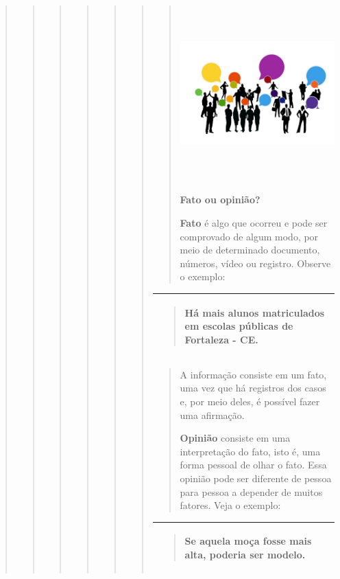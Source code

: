 \begin{quote}
\begin{quote}
\begin{quote}
\begin{quote}
\begin{quote}
\begin{quote}
\begin{quote}
\includegraphics[width=3.98294in,height=2.65514in]{media/image24.jpeg}

\textbf{Fato ou opinião?}

\textbf{Fato} é algo que ocorreu e pode ser comprovado de algum modo,
por meio de determinado documento, números, vídeo ou registro. Observe o
exemplo:
\end{quote}

\begin{longtable}[]{@{}l@{}}
\toprule
\begin{minipage}[t]{0.97\columnwidth}\raggedright\strut
\begin{quote}
Há mais alunos matriculados em escolas públicas de Fortaleza - CE.
\end{quote}\strut
\end{minipage}\tabularnewline
\bottomrule
\end{longtable}

\begin{quote}
A informação consiste em um fato, uma vez que há registros dos casos e,
por meio deles, é possível fazer uma afirmação.

\textbf{Opinião} consiste em uma interpretação do fato, isto é, uma
forma pessoal de olhar o fato. Essa opinião pode ser diferente de pessoa
para pessoa a depender de muitos fatores. Veja o exemplo:
\end{quote}

\begin{longtable}[]{@{}l@{}}
\toprule
\begin{minipage}[t]{0.97\columnwidth}\raggedright\strut
\begin{quote}
Se aquela moça fosse mais alta, poderia ser modelo.
\end{quote}\strut
\end{minipage}\tabularnewline
\bottomrule
\end{longtable}


\end{quote}
\end{quote}
\end{quote}
\end{quote}
\end{quote}
\end{quote}
